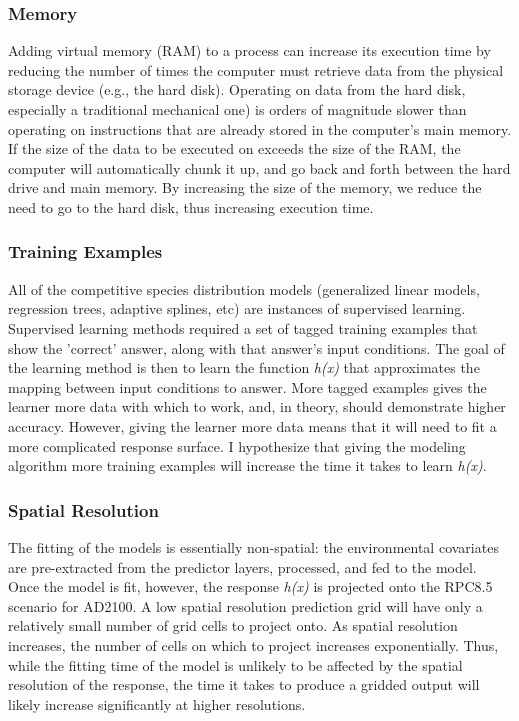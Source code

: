 \documentclass[a4paper]{article}
\begin{document}
\subsubsection{Memory}
Adding virtual memory (RAM) to a process can increase its execution time by reducing the number of times the computer must retrieve data from the physical storage device (e.g., the hard disk).  Operating on data from the hard disk, especially a traditional mechanical one) is orders of magnitude slower than operating on instructions that are already stored in the computer's main memory. If the size of the data to be executed on exceeds the size of the RAM, the computer will automatically chunk it up, and go back and forth between the hard drive and main memory.  By increasing the size of the memory, we reduce the need to go to the hard disk, thus increasing execution time. 

\subsubsection{Training Examples}
All of the competitive species distribution models (generalized linear models, regression trees, adaptive splines, etc) are instances of supervised learning.  Supervised learning methods required a set of tagged training examples that show the 'correct' answer, along with that answer's input conditions.  The goal of the learning method is then to learn the function \textit{h(x)} that approximates the mapping between input conditions to answer.  More tagged examples gives the learner more data with which to work, and, in theory, should demonstrate higher accuracy.  However, giving the learner more data means that it will need to fit a more complicated response surface. I hypothesize that giving the modeling algorithm more training examples will increase the time it takes to learn \textit{h(x)}.

\subsubsection{Spatial Resolution}
The fitting of the models is essentially non-spatial: the environmental covariates are pre-extracted from the predictor layers, processed, and fed to the model.  Once the model is fit, however, the response \textit{h(x)} is projected onto the RPC8.5 scenario for AD2100.  A low spatial resolution prediction grid will have only a relatively small number of grid cells to project onto. As spatial resolution increases, the number of cells on which to project increases exponentially.  Thus, while the fitting time of the model is unlikely to be affected by the spatial resolution of the response, the time it takes to produce a gridded output will likely increase significantly at higher resolutions.
\end{document}
